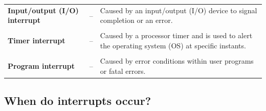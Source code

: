 \documentclass[a4paper]{systems-software}
\begin{document}
\begin{longtabu} to \textwidth { X[1.5,l] X[0.2,l] X[7,l]}
	\textbf{\textbullet Input/output (I/O) interrupt}
	& -- &
	Caused by an input/output (I/O) device to signal completion or an error.
	\\
	\\
	\textbf{\textbullet Timer interrupt}
	& -- &
	Caused by a processor timer and is used to alert the operating system (OS) at specific instants.
	\\
	\\
	\textbf{\textbullet Program interrupt}
	& -- &
	Caused by error conditions within user programs or fatal errors.
\end{longtabu}


\subsection*{When do interrupts occur?}
\end{document}
